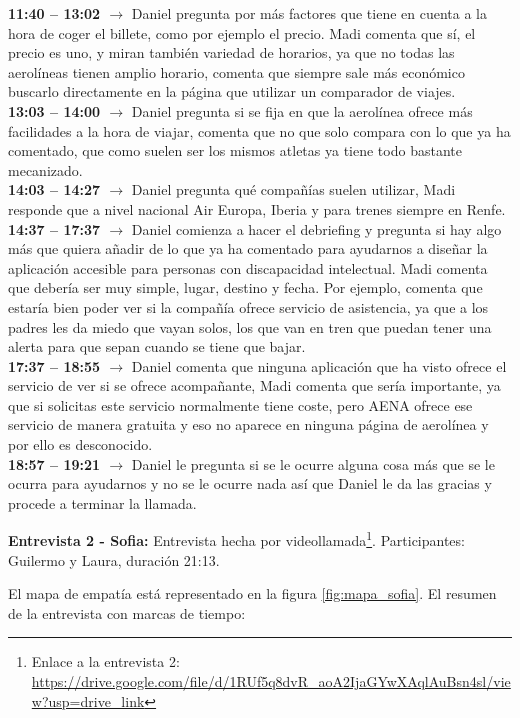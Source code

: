 \textbf{11:40 -- 13:02 $\rightarrow$} Daniel pregunta por más factores que tiene en cuenta a la hora de coger el billete, como por ejemplo el precio. Madi comenta que sí, el precio es uno, y miran también variedad de horarios, ya que no todas las aerolíneas tienen amplio horario, comenta que siempre sale más económico buscarlo directamente en la página que utilizar un comparador de viajes. \\
\textbf{13:03 -- 14:00 $\rightarrow$} Daniel pregunta si se fija en que la aerolínea ofrece más facilidades a la hora de viajar, comenta que no que solo compara con lo que ya ha comentado, que como suelen ser los mismos atletas ya tiene todo bastante mecanizado. \\
\textbf{14:03 -- 14:27 $\rightarrow$} Daniel pregunta qué compañías suelen utilizar, Madi responde que a nivel nacional Air Europa, Iberia y para trenes siempre en Renfe. \\
\textbf{14:37 -- 17:37 $\rightarrow$} Daniel comienza a hacer el debriefing y pregunta si hay algo más que quiera añadir de lo que ya ha comentado para ayudarnos a diseñar la aplicación accesible para personas con discapacidad intelectual. Madi comenta que debería ser muy simple, lugar, destino y fecha. Por ejemplo, comenta que estaría bien poder ver si la compañía ofrece servicio de asistencia, ya que a los padres les da miedo que vayan solos, los que van en tren que puedan tener una alerta para que sepan cuando se tiene que bajar. \\
\textbf{17:37 -- 18:55 $\rightarrow$} Daniel comenta que ninguna aplicación que ha visto ofrece el servicio de ver si se ofrece acompañante, Madi comenta que sería importante, ya que si solicitas este servicio normalmente tiene coste, pero AENA ofrece ese servicio de manera gratuita y eso no aparece en ninguna página de aerolínea y por ello es desconocido. \\
\textbf{18:57 -- 19:21 $\rightarrow$} Daniel le pregunta si se le ocurre alguna cosa más que se le ocurra para ayudarnos y no se le ocurre nada así que Daniel le da las gracias y procede a terminar la llamada.


\textbf{Entrevista 2 - Sofia:} Entrevista hecha por videollamada\footnote{Enlace a la entrevista 2: \url{https://drive.google.com/file/d/1RUf5q8dvR_aoA2IjaGYwXAqlAuBsn4sl/view?usp=drive_link}}. Participantes: Guilermo y Laura, duración 21:13.

El mapa de empatía está representado en la figura \ref{fig:mapa_sofia}. El resumen de la entrevista con marcas de tiempo:

